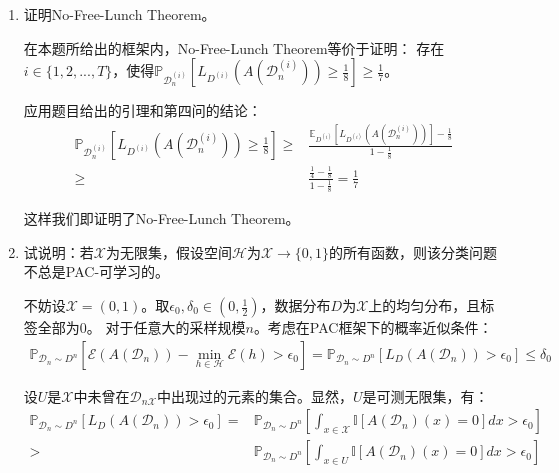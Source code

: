 \documentclass[12pt, a4paper]{article}
\newcommand{\under}[1]{\mathop{#1}\limits_}
\newcommand{\expect}{{\mathbb{E}}}
\newcommand{\unit}{{\mathbb{I}}}
\newcommand{\prob}{{\mathbb{P}}}
\newcommand{\EE}{{\mathcal{E}}}
\newcommand{\XX}{{\mathcal{X}}}
\newcommand{\HH}{{\mathcal{H}}}
\newcommand{\DD}{{\mathcal{D}}}
\begin{document}
\begin{enumerate}
        综上：
        \begin{align*}
        \under{\max}{1 \le i \le T} \expect_{\DD_n^{(i)}}[L_{D^{(i)}}(A(\DD_n^{(i)}))]
        \ge& \under{\min}{1 \le j \le k} \frac{1}{2 p T} \sum_{r = 1}^{p} \sum_{i = 1}^{T} \unit[A(S_j^{(i)})(v_r) \ne f_i(v_r)] \\
        =& \under{\min}{1 \le j \le k} \frac{1}{2 p T} \sum_{r = 1}^{p} \frac{T}{2} = \frac{1}{4}
        \end{align*}

        命题得证。

    \item 证明No-Free-Lunch Theorem。

        在本题所给出的框架内，No-Free-Lunch Theorem等价于证明：
        存在$i \in \{1, 2, ..., T\}$，使得$\prob_{\DD_n^{(i)}}[L_{D^{(i)}}(A(\DD_n^{(i)})) \ge \frac{1}{8}] \ge \frac{1}{7}$。

        应用题目给出的引理和第四问的结论：
        \begin{align*}
        \prob_{\DD_n^{(i)}}[L_{D^{(i)}}(A(\DD_n^{(i)})) \ge \frac{1}{8}]
        \ge& \frac{\expect_{D^{(i)}}[L_{D^{(i)}}(A(\DD_n^{(i)}))] - \frac{1}{8}}{1 - \frac{1}{8}} \\
        \ge& \frac{\frac{1}{4} - \frac{1}{8}}{1 - \frac{1}{8}} = \frac{1}{7}
        \end{align*}

        这样我们即证明了No-Free-Lunch Theorem。

    \item 试说明：若$\XX$为无限集，假设空间$\HH$为$\XX \rightarrow \{0, 1\}$的所有函数，则该分类问题不总是PAC-可学习的。

        不妨设$\XX = (0, 1)$。取$\epsilon_0, \delta_0 \in (0, \frac{1}{2})$，数据分布$D$为$\XX$上的均匀分布，且标签全部为$0$。
        对于任意大的采样规模$n$。考虑在PAC框架下的概率近似条件：
        \begin{align*}
        \prob_{\DD_n \sim D^n} [\EE(A(\DD_n)) - \under{\min}{h \in \HH}\EE(h) > \epsilon_0]
        = \prob_{\DD_n \sim D^n} [L_D(A(\DD_n)) > \epsilon_0] \le \delta_0
        \end{align*}

        设$U$是$\XX$中未曾在$\DD_{n\XX}$中出现过的元素的集合。显然，$U$是可测无限集，有：
        \begin{align*}
        \prob_{\DD_n \sim D^n} [L_D(A(\DD_n)) > \epsilon_0]
        =& \prob_{\DD_n \sim D^n} [\int_{x \in \XX} \unit[A(\DD_n)(x) = 0] dx  > \epsilon_0] \\
        >& \prob_{\DD_n \sim D^n} [\int_{x \in U} \unit[A(\DD_n)(x) = 0] dx  > \epsilon_0]
        \end{align*}


\end{enumerate}
\end{document}
